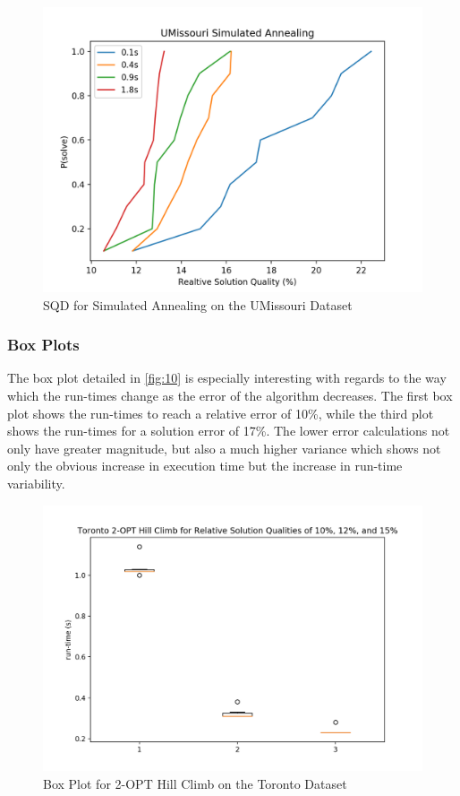 \documentclass[format=sigconf]{acmart}
\begin{document}
\begin{figure}[htbp]
    \centerline{\includegraphics[scale=.5]{graphs/UMissouri_LS2_SQD.png}}
    \caption{SQD for Simulated Annealing on the UMissouri Dataset}
    \label{fig:8}
\end{figure}
\newpage
\subsubsection{Box Plots}
The box plot detailed in \autoref{fig:10} is especially interesting with regards to the way which the run-times
change as the error of the algorithm decreases. The first box plot shows the run-times to reach a relative error of 10\%, while the third plot 
shows the run-times for a solution error of 17\%. The lower error calculations not only have greater magnitude, but also a much higher variance 
which shows not only the obvious increase in execution time but the increase in run-time variability.
\begin{figure}[htbp]
    \centerline{\includegraphics[scale=.5]{graphs/Toronto_LS1_Box.png}}
    \caption{Box Plot for 2-OPT Hill Climb on the Toronto Dataset}
    \label{fig:9}
\end{figure}
\end{document}
